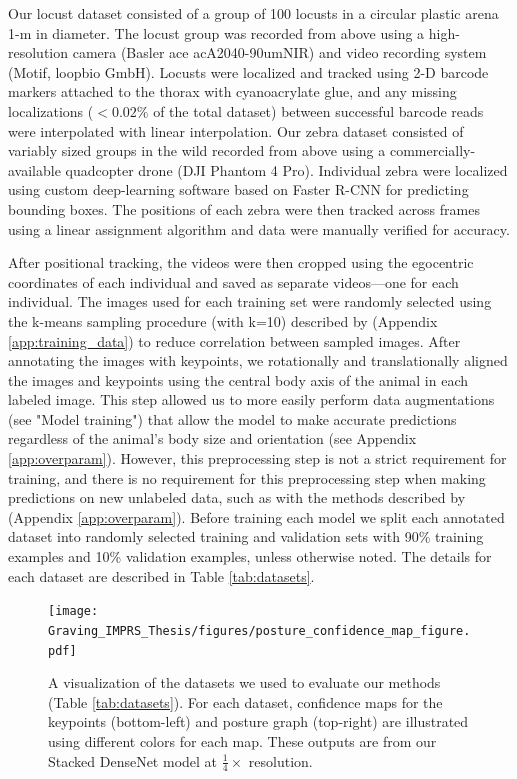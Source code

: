 \documentclass[11pt,a4paper,oneside]{book}
\begin{document}
\begin{doublespace}
Our locust dataset consisted of a group of 100 locusts in a circular plastic arena 1-m in diameter. The locust group was recorded from above using a high-resolution camera (Basler ace acA2040-90umNIR) and video recording system (Motif, loopbio GmbH). Locusts were localized and tracked using 2-D barcode markers \citep{graving2017pinpoint} attached to the thorax with cyanoacrylate glue, and any missing localizations ($<0.02 \%$ of the total dataset) between successful barcode reads were interpolated with linear interpolation.  Our zebra dataset consisted of variably sized groups in the wild recorded from above using a commercially-available quadcopter drone (DJI Phantom 4 Pro). Individual zebra were localized using custom deep-learning software based on Faster R-CNN \citep{ren2015faster} for predicting bounding boxes. The positions of each zebra were then tracked across frames using a linear assignment algorithm \citep{munkres1957algorithms} and data were manually verified for accuracy.

After positional tracking, the videos were then cropped using the egocentric coordinates of each individual and saved as separate videos---one for each individual. The images used for each training set were randomly selected using the k-means sampling procedure (with k=10) described by \cite{pereira2019fast} (Appendix \ref{app:training_data}) to reduce correlation between sampled images. After annotating the images with keypoints, we rotationally and translationally aligned the images and keypoints using the central body axis of the animal in each labeled image. This step allowed us to more easily perform data augmentations (see "Model training") that allow the model to make accurate predictions regardless of the animal's body size and orientation (see Appendix \ref{app:overparam}). However, this preprocessing step is not a strict requirement for training, and there is no requirement for this preprocessing step when making predictions on new unlabeled data, such as with the methods described by \cite{pereira2019fast} (Appendix \ref{app:overparam}). Before training each model we split each annotated dataset into randomly selected training and validation sets with 90\% training examples and 10\% validation examples, unless otherwise noted. The details for each dataset are described in Table \ref{tab:datasets}.

\begin{figure}[!htb]

\begin{center}
\texttt{[image: Graving\_IMPRS\_Thesis/figures/posture\_confidence\_map\_figure.pdf]}
\end{center}
\caption{A visualization of the datasets we used to evaluate our methods (Table \ref{tab:datasets}). For each dataset, confidence maps for the keypoints (bottom-left) and posture graph (top-right) are illustrated using different colors for each map. These outputs are from our Stacked DenseNet model at $\frac{1}{4}\times$ resolution.}
\label{fig:posture_confidence_map_figure}



\end{figure}
\end{doublespace}
\end{document}
